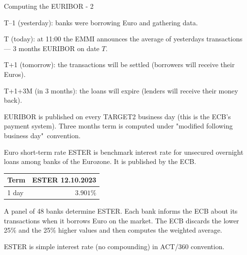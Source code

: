 \documentclass{beamer}
\begin{document}
\begin{frame}{Computing the EURIBOR - 2}
\centering
{}
	
\justify
T--1 (yesterday):  banks were borrowing Euro and gathering data.

T (today): at 11:00 the EMMI announces the average of yesterdays transactions --- 3 months EURIBOR on date $T$.

T+1 (tomorrow): the transactions will be settled (borrowers will receive their Euros).

T+1+3M (in 3 months): the loans will expire (lenders will receive their money back).

\justify
EURIBOR is published on every TARGET2 business day (this is the ECB's payment system). Three months term is computed under "modified following business day"\ convention.
\end{frame}



\begin{frame}{Euro short-term rate}
\justify
\alert{ESTER} is benchmark interest rate for unsecured overnight loans among banks of the Eurozone. It is published by the ECB.

\justify
\centering
\begin{tabular}{l|r}
Term  & ESTER 12.10.2023 \\ \hline
1 day & $3.901\%$
\end{tabular}

\justify
A panel of 48 banks determine ESTER. Each bank informs the ECB about its transactions when it borrows Euro on the market. The ECB discards the lower 25\%  and the 25\% higher values and then computes the weighted average.

\justify
ESTER is simple interest rate (no compounding) in ACT/360 convention.
\end{frame}
\end{document}
